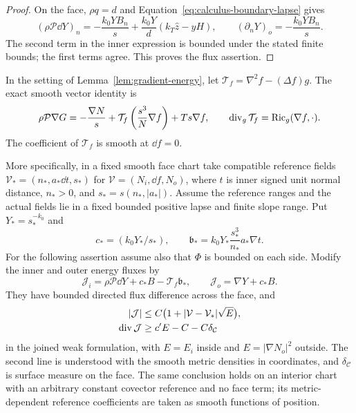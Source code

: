 \begin{proof}
On the face, $\rho q=d$ and
Equation~\eqref{eq:calculus-boundary-lapse} gives
\begin{equation}
 (\rho\mathcal P\dd Y)_n
   =-\frac{k_0YB_n}{s}
          +\frac{k_0Y}{d}(k_T\hat z-yH),
 \qquad
 (\partial_nY)_o=-\frac{k_0YB_n}{s}.
 \label{eq:calculus-energy-seam-flux}
\end{equation}
The second term in the inner expression is bounded under the stated
finite bounds; the first terms agree.  This proves the flux assertion.
\end{proof}

\begin{lemma}\label{lem:newton-flux}
In the setting of Lemma~\ref{lem:gradient-energy}, let
$\mathcal T_f=\nabla^2f-(\Delta f)g$.  The exact smooth vector identity
is
\begin{equation}
 \rho\mathcal P\nabla G
   =-\frac{\nabla N}{s}
      +\mathcal T_f\left(\frac{s^3}{N}\nabla f\right)
      +Ts\nabla f,
 \qquad
 \operatorname{div}_g\mathcal T_f=\operatorname{Ric}_g(\nabla f,\cdot).
 \label{eq:calculus-newton}
\end{equation}
The coefficient of $\mathcal T_f$ is smooth at $\dd f=0$.

More specifically, in a fixed smooth face chart take compatible
reference fields
$\mathcal V_*=(n_*,a_*\dd t,s_*)$ for
$\mathcal V=(N_i,\dd f,N_o)$, where $t$ is inner signed unit normal
distance, $n_*>0$, and $s_*=s(n_*,|a_*|)$.
Assume the reference ranges and the actual fields lie in a fixed
bounded positive lapse and finite slope range.  Put
$Y_*=s_*^{-k_0}$ and
\[
 c_*=(k_0Y_*/s_*) ,\qquad
 \mathfrak b_*=k_0Y_*\frac{s_*^3}{n_*}a_*\nabla t.
\]
For the following assertion assume also that $\Phi$ is bounded
on each side.  Modify the inner and outer energy fluxes by
\begin{equation}
 \mathcal J_i=\rho\mathcal P\dd Y+c_*B-\mathcal T_f\mathfrak b_* ,
 \qquad \mathcal J_o=\nabla Y+c_*B.
 \label{eq:calculus-frozen-flux}
\end{equation}
They have bounded directed flux difference across the face, and
\begin{align}
 |\mathcal J|&\le C\bigl(1+|\mathcal V-\mathcal V_*|\sqrt E\bigr),
 \label{eq:calculus-frozen-flux-size}\\
 \operatorname{div}\mathcal J&\ge c'E-C-C\delta_{\mathcal C}
 \label{eq:calculus-frozen-flux-divergence}
\end{align}
in the joined weak formulation, with $E=E_i$ inside and
$E=|\nabla N_o|^2$ outside.  The second line is understood with the
smooth metric densities in coordinates, and $\delta_{\mathcal C}$ is
surface measure on the face.  The same conclusion holds on an interior
chart with an arbitrary constant covector reference and no face term;
its metric-dependent reference coefficients are taken as smooth
functions of position.
\end{lemma}


